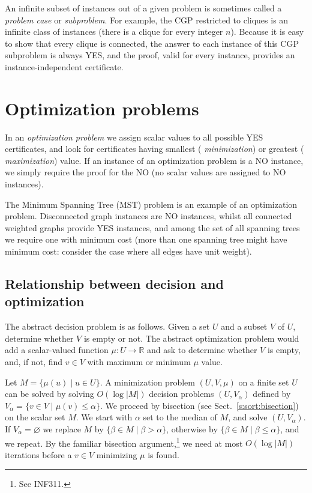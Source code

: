 \documentclass[a4paper]{book}
\theoremstyle{changebreak}                %
\begin{document}
An infinite subset of instances out of a given problem is sometimes
called a {\it problem case} or 
{\it subproblem}. For example, the CGP restricted to
cliques is an infinite class of instances (there is a
clique for every integer $n$). Because it is easy to show that every
clique is connected, the answer to each instance of this CGP
subproblem is always YES, and the proof, valid for every instance,
provides an instance-independent certificate.

\section{Optimization problems}
In an {\it optimization problem} we assign
scalar values to all possible YES certificates, and look
for certificates having smallest ({\it
  minimization}) or greatest ({\it
  maximization}) value. If an instance of an
optimization problem is a NO instance, we simply require the proof for
the NO (no scalar values are assigned to NO instances).

The {\sc Minimum Spanning Tree} (MST)
problem is an example of an optimization
problem. Disconnected graph instances are NO
instances, whilst all connected weighted graphs
provide YES instances, and among the set of all
spanning trees we require one with minimum cost
(more than one spanning tree might have minimum cost: consider the
case where all edges have unit weight).

\subsection{Relationship between decision and optimization}
\label{s:problem:decopt}
The abstract decision problem is as
follows. Given a set $U$ and a subset $V$ of $U$,
determine whether $V$ is empty or not. The abstract
optimization problem would add a
scalar-valued function
$\mu:U\to\mathbb{R}$ and ask to determine whether $V$ is empty, and,
if not, find $v\in V$ with maximum or minimum $\mu$
value.

Let $M=\{\mu(u)\;|\;u\in U\}$. A minimization
problem $(U,V,\mu)$ on a finite set $U$
can be solved by solving $O(\log|M|)$ decision
problems $(U,V_\alpha)$ defined by
$V_\alpha=\{v\in V \;|\;\mu(v)\le\alpha\}$. We proceed by
bisection (see Sect.~\ref{s:sort:bisection}) on the
scalar set $M$. We start with $\alpha$ set to the
median of $M$, and solve $(U,V_\alpha)$. If
$V_\alpha=\varnothing$ we replace $M$ by $\{\beta\in
M\;|\;\beta>\alpha\}$, otherwise by $\{\beta\in
M\;|\;\beta\le\alpha\}$, and we repeat. By the familiar
bisection argument,\footnote{See INF311.}  we need at
most $O(\log|M|)$ iterations before a $v\in V$ minimizing $\mu$ is
found.
\end{document}
